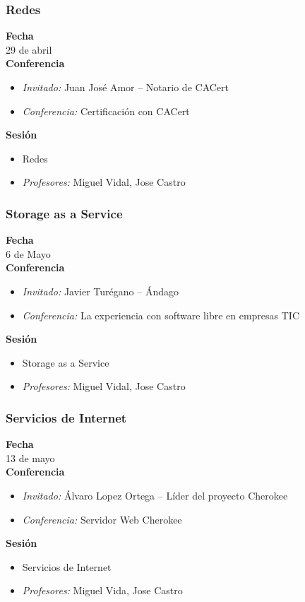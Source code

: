 \documentclass{beamer}
\begin{document}
\begin{frame}
  \frametitle{Redes}
  \textbf{Fecha}\\
    29 de abril\\
  \textbf{Conferencia}
    \begin{itemize}
      \item \textit{Invitado:} Juan José Amor -- Notario de CACert
      \item \textit{Conferencia:} Certificación con CACert
    \end{itemize}
  \textbf{Sesión}
    \begin{itemize}
      \item Redes
      \item \textit{Profesores:} Miguel Vidal, Jose Castro
    \end{itemize}
\end{frame}

\begin{frame}
  \frametitle{Storage as a Service}
  \textbf{Fecha}\\
    6 de Mayo\\
  \textbf{Conferencia}
    \begin{itemize}
      \item \textit{Invitado:} Javier Turégano -- Ándago
      \item \textit{Conferencia:} La experiencia con software libre en empresas TIC
    \end{itemize}
  \textbf{Sesión}
    \begin{itemize}
      \item Storage as a Service
      \item \textit{Profesores:} Miguel Vidal, Jose Castro
    \end{itemize}
\end{frame}

\begin{frame}
  \frametitle{Servicios de Internet}
  \textbf{Fecha}\\
    13 de mayo\\
  \textbf{Conferencia}
    \begin{itemize}
      \item \textit{Invitado:} Álvaro Lopez Ortega -- Líder del proyecto Cherokee
      \item \textit{Conferencia:} Servidor Web Cherokee
    \end{itemize}
  \textbf{Sesión}
    \begin{itemize}
      \item Servicios de Internet
      \item \textit{Profesores:} Miguel Vida, Jose Castro
    \end{itemize}
\end{frame}
\end{document}
